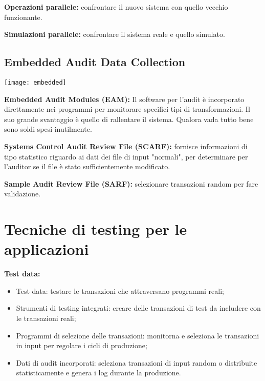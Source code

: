 \textbf{Operazioni parallele:} confrontare il nuovo sistema con quello vecchio
funzionante.

\textbf{Simulazioni parallele:} confrontare il sistema reale e quello simulato.

\subsection{Embedded Audit Data Collection}

        \begin{center}
                \texttt{[image: embedded]}
        		\label{fig:testing:embedded:audit:data:collection}
        \end{center}


\textbf{Embedded Audit Modules (EAM):} Il software per l'audit è incorporato
direttamente nei programmi per monitorare specifici tipi di transformazioni.
Il suo grande svantaggio è quello di rallentare il sistema. Qualora vada tutto
bene sono soldi spesi inutilmente.

\textbf{Systems Control Audit Review File (SCARF):} fornisce informazioni di
tipo statistico riguardo ai dati dei file di input "normali", per determinare
per l'auditor se il file è stato sufficientemente modificato.

\textbf{Sample Audit Review File (SARF):} selezionare transazioni random per
fare validazione.

\section{Tecniche di testing per le applicazioni}

\textbf{Test data:}
\begin{itemize}
    \item Test data: testare le transazioni che attraversano programmi reali;
    \item Strumenti di testing integrati: creare delle transazioni di test da
    includere con le transazioni reali;
    \item Programmi di selezione delle transazioni: monitorna e seleziona le
    transazioni in input per regolare i cicli di produzione;
    \item Dati di audit incorporati: seleziona transazioni di input random o
    distribuite statisticamente e genera i log durante la produzione.
\end{itemize}

